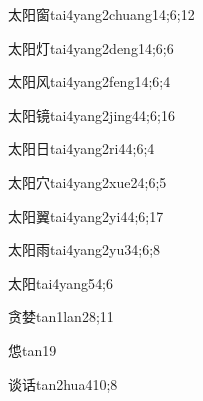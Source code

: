 \begin{verbete}{太阳窗}{tai4yang2chuang1}{4;6;12}
\end{verbete}

\begin{verbete}{太阳灯}{tai4yang2deng1}{4;6;6}
\end{verbete}

\begin{verbete}{太阳风}{tai4yang2feng1}{4;6;4}
\end{verbete}

\begin{verbete}{太阳镜}{tai4yang2jing4}{4;6;16}
\end{verbete}

\begin{verbete}{太阳日}{tai4yang2ri4}{4;6;4}
\end{verbete}

\begin{verbete}{太阳穴}{tai4yang2xue2}{4;6;5}
\end{verbete}

\begin{verbete}{太阳翼}{tai4yang2yi4}{4;6;17}
\end{verbete}

\begin{verbete}{太阳雨}{tai4yang2yu3}{4;6;8}
\end{verbete}

\begin{verbete}{太阳}{tai4yang5}{4;6}
\end{verbete}

\begin{verbete}{贪婪}{tan1lan2}{8;11}
\end{verbete}

\begin{verbete}{怹}{tan1}{9}
\end{verbete}

\begin{verbete}{谈话}{tan2hua4}{10;8}
\end{verbete}

